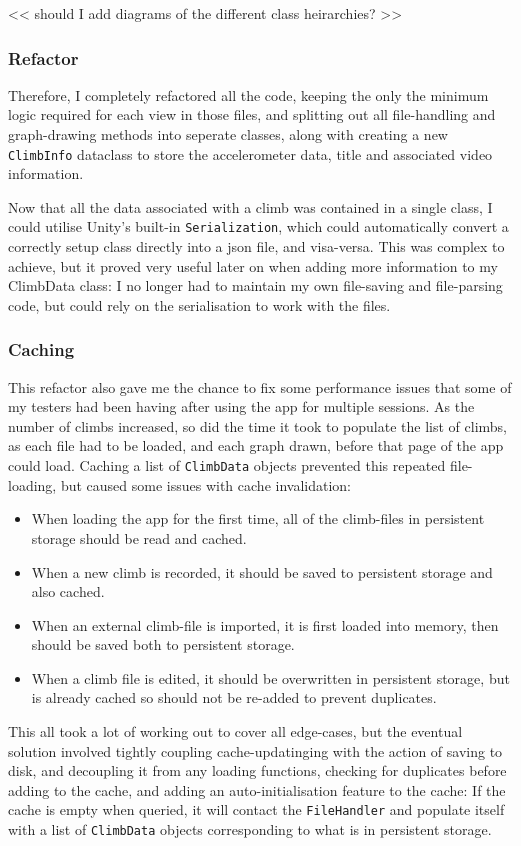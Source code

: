 << should I add diagrams of the different class heirarchies? >>

\subsubsection{Refactor}
Therefore, I completely refactored all the code, keeping the only the minimum logic required for each view in those files, and splitting out all file-handling and graph-drawing methods into seperate classes, along with creating a new \verb|ClimbInfo| dataclass to store the accelerometer data, title and associated video information.

Now that all the data associated with a climb was contained in a single class, I could utilise Unity's built-in \verb|Serialization|, which could automatically convert a correctly setup class directly into a json file, and visa-versa. 
This was complex to achieve, but it proved very useful later on when adding more information to my ClimbData class: I no longer had to maintain my own file-saving and file-parsing code, but could rely on the serialisation to work with the files.


\subsubsection{Caching}
This refactor also gave me the chance to fix some performance issues that some of my testers had been having after using the app for multiple sessions.
As the number of climbs increased, so did the time it took to populate the list of climbs, as each file had to be loaded, and each graph drawn, before that page of the app could load.
Caching a list of \verb|ClimbData| objects prevented this repeated file-loading, but caused some issues with cache invalidation:
\begin{itemize}
    \item When loading the app for the first time, all of the climb-files in persistent storage should be read and cached.
    \item When a new climb is recorded, it should be saved to persistent storage and also cached.
    \item When an external climb-file is imported, it is first loaded into memory, then should be saved both to persistent storage.
    \item When a climb file is edited, it should be overwritten in persistent storage, but is already cached so should not be re-added to prevent duplicates.
\end{itemize}
This all took a lot of working out to cover all edge-cases, but the eventual solution involved tightly coupling cache-updatinging with the action of saving to disk, and decoupling it from any loading functions, checking for duplicates before adding to the cache, and adding an auto-initialisation feature to the cache:
If the cache is empty when queried, it will contact the \verb|FileHandler| and populate itself with a list of \verb|ClimbData| objects corresponding to what is in persistent storage.


